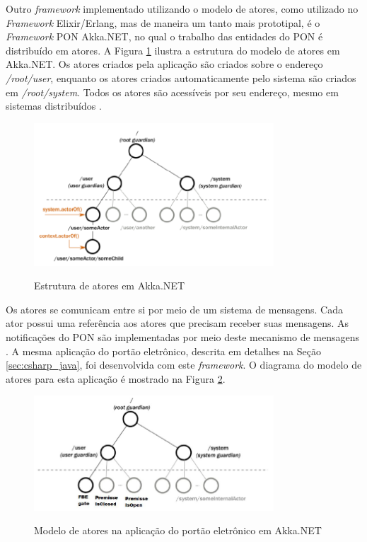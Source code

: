 Outro \textit{framework} implementado utilizando o modelo de atores, como
utilizado no \textit{Framework} Elixir/Erlang, mas de maneira um tanto mais
prototipal, é o \textit{Framework} PON Akka.NET, no qual o trabalho das
entidades do PON é distribuído em atores. A Figura \ref{fig:akka_actor} ilustra
a estrutura do modelo de atores em Akka.NET. Os atores criados pela aplicação
são criados sobre o endereço \textit{/root/user}, enquanto os atores criados
automaticamente pelo sistema são criados em \textit{/root/system}. Todos os
atores são acessíveis por seu endereço, mesmo em sistemas distribuídos
\cite{martini_2019}.

\begin{figure}[!htb]
  \centering
  \caption{Estrutura de atores em Akka.NET}
  \includegraphics[width=0.8\textwidth]{../figures/atores_akka.png}
  \smallskip
  \label{fig:akka_actor}
\end{figure}

Os atores se comunicam entre si por meio de um sistema de mensagens. Cada ator
possui uma referência aos atores que precisam receber suas mensagens. As
notificações do PON são implementadas por meio deste mecanismo de mensagens
\cite{martini_2019}. A mesma aplicação do portão eletrônico, descrita em
detalhes na Seção \ref{sec:csharp_java}, foi desenvolvida com este \textit{framework}.
O diagrama do modelo de atores para esta aplicação é mostrado na Figura
\ref{fig:akka_portao}.

\begin{figure}[!htb]
  \centering
  \caption{Modelo de atores na aplicação do portão eletrônico em Akka.NET}
  \includegraphics[width=0.8\textwidth]{../figures/akka_actor.png}
  \smallskip
  \label{fig:akka_portao}
\end{figure}

